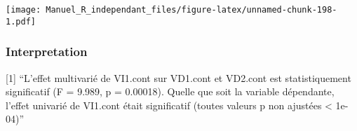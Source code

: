 \documentclass[
]{book}
\begin{document}
\texttt{[image: Manuel\_R\_independant\_files/figure-latex/unnamed-chunk-198-1.pdf]}

\hypertarget{interpretation-20}{%
\subsubsection{Interpretation}\label{interpretation-20}}

{[}1{]} ``L'effet multivarié de VI1.cont sur VD1.cont et VD2.cont est statistiquement significatif (F = 9.989, p = 0.00018). Quelle que soit la variable dépendante, l'effet univarié de VI1.cont était significatif (toutes valeurs p non ajustées \textless{} 1e-04)''

  
\end{document}
